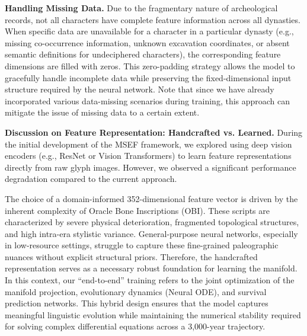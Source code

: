 \documentclass{article}
\begin{document}
\textbf{Handling Missing Data.} Due to the fragmentary nature of archeological records, not all characters have complete feature information across all dynasties. When specific data are unavailable for a character in a particular dynasty (e.g., missing co-occurrence information, unknown excavation coordinates, or absent semantic definitions for undeciphered characters), the corresponding feature dimensions are filled with zeros. This zero-padding strategy allows the model to gracefully handle incomplete data while preserving the fixed-dimensional input structure required by the neural network. Note that since we have already incorporated various data-missing scenarios during training, this approach can mitigate the issue of missing data to a certain extent.


\textbf{Discussion on Feature Representation: Handcrafted vs. Learned.} 
During the initial development of the MSEF framework, we explored using deep vision encoders (e.g., ResNet or Vision Transformers) to learn feature representations directly from raw glyph images. However, we observed a significant performance degradation compared to the current approach. 

The choice of a domain-informed 352-dimensional feature vector is driven by the inherent complexity of Oracle Bone Inscriptions (OBI). These scripts are characterized by severe physical deterioration, fragmented topological structures, and high intra-era stylistic variance. General-purpose neural networks, especially in low-resource settings, struggle to capture these fine-grained paleographic nuances without explicit structural priors. Therefore, the handcrafted representation serves as a necessary robust foundation for learning the manifold. In this context, our ``end-to-end'' training refers to the joint optimization of the manifold projection, evolutionary dynamics (Neural ODE), and survival prediction networks. This hybrid design ensures that the model captures meaningful linguistic evolution while maintaining the numerical stability required for solving complex differential equations across a 3,000-year trajectory.



\end{document}
